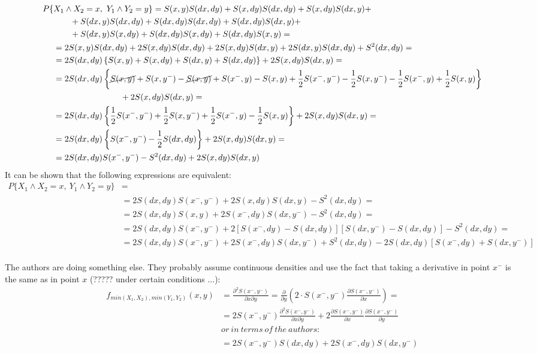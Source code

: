 \documentclass[]{article}
\begin{document}
  $$
  \begin{aligned}
P\{ &X_{1}\wedge X_{2} = x,~Y_{1}\wedge Y_{2} = y \} 
      = S(x,y)S(dx, dy) +  S(x,dy)S(dx, dy) + S(x,dy)S(dx, y) + \\
      &~~~~~~+ S(dx,y)S(dx, dy) +  S(dx,dy)S(dx, dy) + S(dx,dy)S(dx, y) + \\
      &~~~~~~+ S(dx,y)S(x, dy) +  S(dx,dy)S(x, dy) + S(dx,dy)S(x, y) = \\
      &= 2S(x,y)S(dx, dy) +  2S(x,dy)S(dx, dy) + 2S(x,dy)S(dx, y) + 2S(dx,y)S(dx, dy) +  S^2(dx,dy) = \\
      &= 2S(dx, dy)\left\{S(x,y) +  S(x,dy) + S(dx,y) +  S(dx,dy)\right\}  + 2S(x,dy)S(dx, y)= \\
      &= 2S(dx, dy)\left\{\cancel{S(x,y)} +  S(x,y^-) - \cancel{S(x,y)} + S(x^-,y) - S(x,y) +  \frac{1}{2}S(x^-,y^-) - \frac{1}{2}S(x,y^-) - \frac{1}{2}S(x^-,y) + \frac{1}{2}S(x,y)\right\}\\
      &~~~~~~~~~~~~~~~~~~~~~~~~  + 2S(x,dy)S(dx, y)= \\
      &= 2S(dx, dy)\left\{\frac{1}{2}S(x^-,y^-)  + \frac{1}{2}S(x,y^-)  + \frac{1}{2}S(x^-,y) - \frac{1}{2}S(x,y)\right\} + 2S(x,dy)S(dx, y) =\\
      &= 2S(dx, dy)\left\{ S(x^-,y^-) -\frac{1}{2}S(dx,dy)\right\} + 2S(x,dy)S(dx, y) =\\
      &= 2S(dx, dy) S(x^-,y^-) -S^2(dx,dy) + 2S(x,dy)S(dx, y)\\
	\end{aligned}
	$$
  It can be shown that the following expressions are equivalent:
  $$
  \begin{aligned}
P\{ X_{1}\wedge X_{2} = x,~Y_{1}\wedge Y_{2} = y \}  &=  &\\
      &= 2S(dx, dy)S(x^-,y^-) + 2S(x,dy)S(dx, y) -S^2(dx,dy)= \\
      &= 2S(dx, dy)S(x,y)+ 2S(x^-,dy)S(dx, y^-)  -S^2(dx,dy)=\\
      &= 2S(dx, dy)S(x^-,y^-) + 2[S(x^-,dy)-S(dx,dy)][S(dx, y^-)-S(dx,dy)]  -S^2(dx,dy)=\\
      &= 2S(dx, dy)S(x^-,y^-) + 2S(x^-,dy)S(dx, y^-) + S^2(dx,dy) - 2S(dx,dy)[S(x^-,dy)+S(dx, y^-)]\\
	\end{aligned}
	$$

  The authors are doing something else. They probably assume continuous densities and use the fact that taking a derivative in point $x^-$ is the same as in point $x$ (????? under certain conditions ...):
	$$
	\begin{aligned}
    f_{min(X_1, X_2),min(Y_1, Y_2)}(x, y) &= \frac{\partial^2 S(x^-, y^-)}{\partial x \partial y} = \frac{\partial}{\partial y} \left(2\cdot S(x^-, y^-) \frac{\partial S(x^-, y^-)}{\partial x}  \right)  =\\
     &=2S(x^-, y^-) \frac{\partial^2 S(x^-, y^-)}{\partial x \partial y}   + 2 \frac{\partial S(x^-, y^-)}{\partial x}\frac{\partial S(x^-, y^-)}{\partial y}\\
     & or~in~terms~of~the~authors:\\
     &~\\
     &= 2 S(x^-, y^-) S(dx, dy) + 2 S(x^-, dy) S(dx, y^-)
	\end{aligned}
	$$
\end{document}

